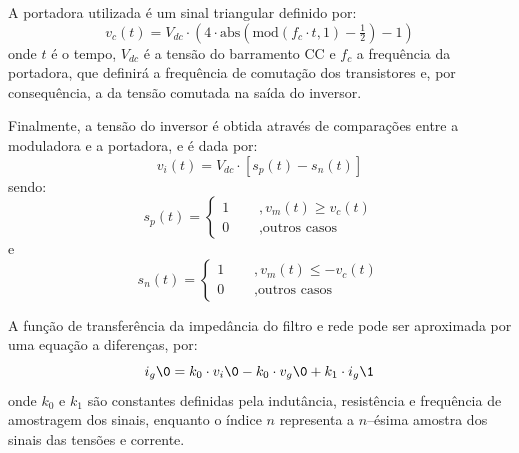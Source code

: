A portadora utilizada é um sinal triangular definido por:
\begin{equation}
    \label{eq:c}
    v_c(t) = V_{dc} \cdot \left( 4 \cdot \text{abs}\! \left( \text{mod} (f_c \cdot t, 1) - \tfrac{1}{2} \right)   -1 \right)
\end{equation}
onde $t$ é o tempo,  $V_{dc}$ é a tensão do barramento CC e $f_c$ a frequência da portadora, que definirá a frequência de comutação
dos transistores e, por consequência, a da tensão comutada na saída do inversor.

Finalmente, a tensão do inversor é obtida através de comparações entre a moduladora e a portadora, e é dada por:
\begin{equation}
    \label{eq:vi}
    v_i(t)= V_{dc} \cdot [ s_{p}(t) - s_{n}(t) ]
\end{equation}
sendo:
\begin{equation}
    \label{eq:vp}
    s_{p}(t) =
    \left\{
    \begin{aligned}
        1       & \ \ \ \ \ \ , v_m(t) \geq v_c(t) \\
        0       & \ \ \ \ \ \ , \text{outros casos}
    \end{aligned}
    \right.
\end{equation}
e
\begin{equation}
    \label{eq:vn}
    s_{n}(t) =
    \left\{
    \begin{aligned}
        1       & \ \ \ \ \ \ , v_m(t) \leq -v_c(t) \\
        0       & \ \ \ \ \ \ , \text{outros casos}
    \end{aligned}
    \right.
\end{equation}

A função de transferência da impedância do filtro e rede pode ser aproximada
por uma equação a diferenças, por:
\begin{equation}
{i_g}\0 = k_0 \cdot {v_i}\0 - k_0 \cdot {v_g}\0 + k_1 \cdot {i_g}\1
\end{equation}
onde $k_0$ e $k_1$ são constantes definidas pela indutância, resistência e frequência de amostragem dos sinais,
enquanto o índice $n$ representa a $n$--ésima amostra dos sinais das tensões e corrente.



